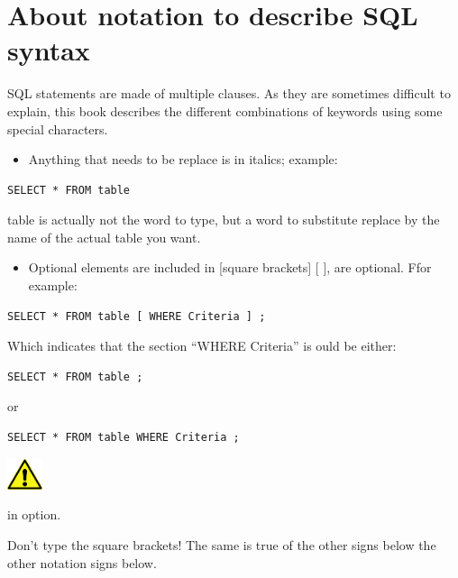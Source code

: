 \section{About notation to describe SQL syntax}
SQL statements are made of multiple clauses. As they are sometimes difficult to explain, this book describes the different combinations of keywords using some special characters.

\begin{itemize}
\item Anything that needs to be replace is in italics; example:
\end{itemize}

\begin{lstlisting}
SELECT * FROM table
\end{lstlisting}

table is actually not the word to type, but a word to substitute replace by the name of the actual table you want.

\begin{itemize}
\item Optional elements are included in [square brackets] [ ], are optional. Ffor example:
\end{itemize}

\begin{lstlisting}
SELECT * FROM table [ WHERE Criteria ] ;
\end{lstlisting}

Which indicates that the section {}``WHERE Criteria{}'' is ould be either:

\begin{lstlisting}
SELECT * FROM table ;
\end{lstlisting}

or

\begin{lstlisting}
SELECT * FROM table WHERE Criteria ;
\end{lstlisting}

\begin{center}
\includegraphics[width=1.048cm,height=0.903cm]{images/img (2).png}
\end{center}

in option.

Don't type the square brackets! The same is true of the other signs below the other notation signs below.

